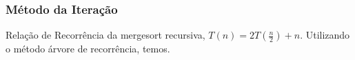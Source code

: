 \subsubsection{Método da Iteração}
Relação de Recorrência da mergesort recursiva, $T(n) = 2T(\frac{n}{2}) + n$. Utilizando o método árvore de recorrência, temos.
